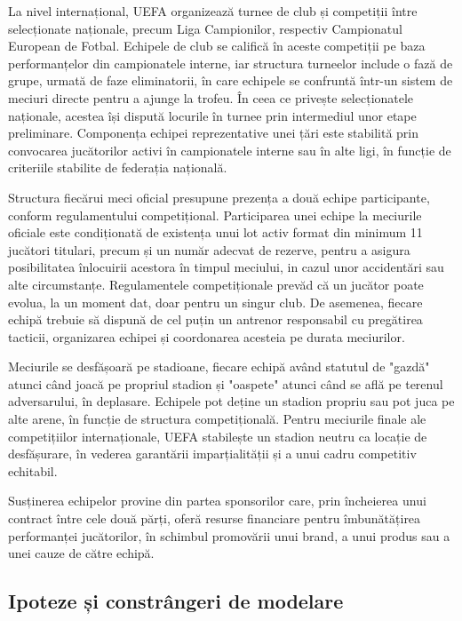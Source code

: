 \documentclass{article}
\begin{document}
	La nivel internațional, UEFA organizează turnee de club și competiții între selecționate naționale, precum Liga Campionilor, respectiv Campionatul European de Fotbal. Echipele de club se califică în aceste competiții pe baza performanțelor din campionatele interne, iar structura turneelor include o fază de grupe, urmată de faze eliminatorii, în care echipele se confruntă într-un sistem de meciuri directe pentru a ajunge la trofeu. În ceea ce privește selecționatele naționale, acestea își dispută locurile în turnee prin intermediul unor etape preliminare. Componența echipei reprezentative unei țări este stabilită prin convocarea jucătorilor activi în campionatele interne sau în alte ligi, în funcție de criteriile stabilite de federația națională.
	
	Structura fiecărui meci oficial presupune prezența a două echipe participante, conform regulamentului competițional. Participarea unei echipe la meciurile oficiale este condiționată de existența unui lot activ format din minimum 11 jucători titulari, precum și un număr adecvat de rezerve, pentru a asigura posibilitatea înlocuirii acestora în timpul meciului, in cazul unor accidentări sau alte circumstanțe. Regulamentele competiționale prevăd că un jucător poate evolua, la un moment dat, doar pentru un singur club. De asemenea, fiecare echipă trebuie să dispună de cel puțin un antrenor responsabil cu pregătirea tacticii, organizarea echipei și coordonarea acesteia pe durata meciurilor.
	
	Meciurile se desfășoară pe stadioane, fiecare echipă având statutul de "gazdă" atunci când joacă pe propriul stadion și "oaspete" atunci când se află pe terenul adversarului, în deplasare. Echipele pot deține un stadion propriu sau pot juca pe alte arene, în funcție de structura competițională. Pentru meciurile finale ale competițiilor internaționale, UEFA stabilește un stadion neutru ca locație de desfășurare, în vederea garantării imparțialității și a unui cadru competitiv echitabil.
	
	Susținerea echipelor provine din partea sponsorilor care, prin încheierea unui contract între cele două părți, oferă resurse financiare pentru îmbunătățirea performanței jucătorilor, în schimbul promovării unui brand, a unui produs sau a unei cauze de către echipă.
	
	\newpage
	
	\subsection{Ipoteze și constrângeri de modelare}
	
\end{document}
